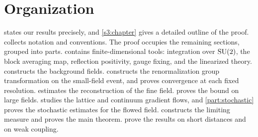 \section{Organization}\label{s1:organization}

 states our results precisely, and \cref{s3:chapter} gives a detailed outline of the proof.  collects notation and conventions. The proof occupies the remaining sections, grouped into parts.  contains finite-dimensional tools: integration over $\mathrm{SU}(2)$, the block averaging map, reflection positivity, gauge fixing, and the linearized theory.  constructs the background fields.  constructs the renormalization group transformation on the small-field event, and proves convergence at each fixed resolution.  estimates the reconstruction of the fine field.  proves the bound on large fields.  studies the lattice and continuum gradient flows, and \cref{part:stochastic} proves the stochastic estimates for the flowed field.  constructs the limiting measure and proves the main theorem.  prove the results on short distances and on weak coupling.
